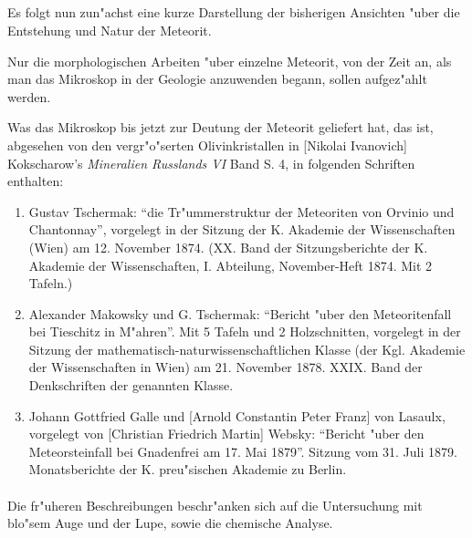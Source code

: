 \documentclass[a4paper, 11pt, oneside]{article}
\begin{document}
\subsection{}
\paragraph{}
Es folgt nun zun"achst eine kurze Darstellung der bisherigen Ansichten "uber die Entstehung und Natur der Meteorit.

Nur die morphologischen Arbeiten "uber einzelne Meteorit, von der Zeit an, als man das Mikroskop in der Geologie anzuwenden begann, sollen aufgez"ahlt werden.

Was das Mikroskop bis jetzt zur Deutung der Meteorit geliefert hat, das ist, abgesehen von den vergr"o"serten Olivinkristallen in [Nikolai Ivanovich] Kokscharow's \emph{Mineralien Russlands VI} Band S. 4, in folgenden Schriften enthalten:
\large
\begin{enumerate}
\item Gustav Tschermak: "`die Tr"ummerstruktur der Meteoriten von Orvinio und Chantonnay"', vorgelegt in der Sitzung der K. Akademie der Wissenschaften (Wien) am 12. November 1874. (XX. Band der Sitzungsberichte der K. Akademie der Wissenschaften, I. Abteilung, November-Heft 1874. Mit 2 Tafeln.)
\item Alexander Makowsky und G. Tschermak: "`Bericht "uber den Meteoritenfall bei Tieschitz in M"ahren"'. Mit 5 Tafeln und 2 Holzschnitten, vorgelegt in der Sitzung der mathematisch-naturwissenschaftlichen Klasse (der Kgl. Akademie der Wissenschaften in Wien) am 21. November 1878. XXIX. Band der Denkschriften der genannten Klasse.
\item Johann Gottfried Galle und [Arnold Constantin Peter Franz] von Lasaulx, vorgelegt von [Christian Friedrich Martin] Websky: "`Bericht "uber den Meteorsteinfall bei Gnadenfrei am 17. Mai 1879"'. Sitzung vom 31. Juli 1879. Monatsberichte der K. preu"sischen Akademie zu Berlin.
\end{enumerate}
\LARGE
\paragraph{}
Die fr"uheren Beschreibungen beschr"anken sich auf die Untersuchung mit blo"sem Auge und der Lupe, sowie die chemische Analyse.
\end{document}
